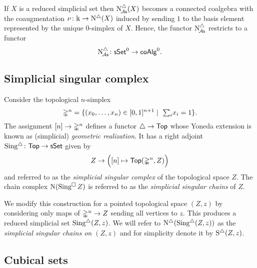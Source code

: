 If $X$ is a reduced simplicial set then $\operatorname{N^{\triangle}_{\!{\mathcal{A}\mathsf{s}}}}(X)$ becomes a connected coalgebra with the coaugmentation $\nu \colon \Bbbk \to \operatorname{N^{\triangle}}(X)$ induced by sending $1$ to the basis element represented by the unique $0$-simplex of $X$.
Hence, the functor $\operatorname{N^{\triangle}_{\!{\mathcal{A}\mathsf{s}}}}$ restricts to a functor
\[
\operatorname{N^{\triangle}_{\!{\mathcal{A}\mathsf{s}}}} \colon \mathsf{sSet}^0 \to \mathsf{coAlg}^0.
\]

\subsection{Simplicial singular complex}

Consider the topological $n$-simplex
\[
\mathbb{\Delta}^{n} = \{(x_0, \dots, x_n) \in [0,1]^{n+1} \mid \ \textstyle{\sum}_i x_i = 1\}.
\]
The assignment $[n] \to \mathbb{\Delta}^n$ defines a functor $\triangle \to \mathsf{Top}$ whose Yoneda extension is known as (simplicial) \textit{geometric realization}.
It has a right adjoint $\operatorname{Sing^{\triangle}} \colon \mathsf{Top} \to \mathsf{sSet}$ given by
\[
Z \to \Big( [n] \mapsto \mathsf{Top}(\mathbb{\Delta}^n, Z) \Big)
\]
and referred to as the \textit{simplicial singular complex} of the topological space $Z$.
The chain complex $\operatorname{N}(\operatorname{Sing^{\square}} Z)$ is referred to as the \textit{simplicial singular chains} of $Z$.

We modify this construction for a pointed topological space $(Z, z)$ by considering only maps of $\mathbb{\Delta}^n \to Z$ sending all vertices to $z$.
This produces a reduced simplicial set $\operatorname{Sing^{\triangle}}(Z, z)$.
We will refer to $\operatorname{N^{\triangle}}(\operatorname{Sing^{\triangle}}(Z, z))$ as the \textit{simplicial singular chains on $(Z, z)$} and for simplicity denote it by $\operatorname{S^{\triangle}}(Z, z)$.

\subsection{Cubical sets} \label{ss:cubical sets}


